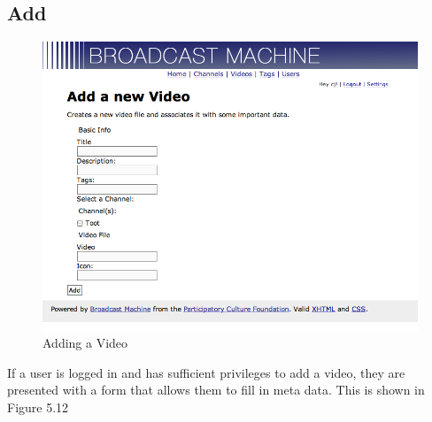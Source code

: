 \documentclass[a4paper,12pt]{report}
\begin{document}
\subsection{Add}
\begin{figure}[htp]
\begin{center}
\includegraphics[width=150mm]{./images/videoadd.png}
\end{center}
\caption{Adding a Video}
\end{figure}

If a user is logged in and has sufficient privileges to add a video, they are presented with a form that allows them to fill in meta data. This is shown in Figure 5.12
\end{document}
